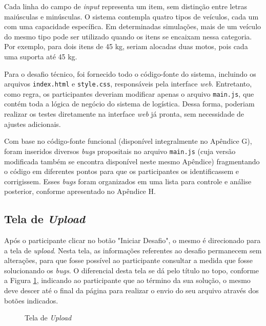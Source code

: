 \documentclass[english,brazilian]{UNISINOSartigo} %
\begin{document}
Cada linha do campo de \textit{input} representa um item, sem distinção entre letras maiúsculas e minúsculas. O sistema contempla quatro tipos de veículos, cada um com uma capacidade específica. Em determinadas simulações, mais de um veículo do mesmo tipo pode ser utilizado quando os itens se encaixam nessa categoria. Por exemplo, para dois itens de 45 kg, seriam alocadas duas motos, pois cada uma suporta até 45 kg.

Para o desafio técnico, foi fornecido todo o código-fonte do sistema, incluindo os arquivos \texttt{index.html} e \texttt{style.css}, responsáveis pela interface \textit{web}. Entretanto, como regra, os participantes deveriam modificar apenas o arquivo \texttt{main.js}, que contém toda a lógica de negócio do sistema de logística. Dessa forma, poderiam realizar os testes diretamente na interface \textit{web} já pronta, sem necessidade de ajustes adicionais.

Com base no código-fonte funcional (disponível integralmente no Apêndice G), foram inseridos diversos \textit{bugs} propositais no arquivo \texttt{main.js} (cuja versão modificada também se encontra disponível neste mesmo Apêndice) fragmentando o código em diferentes pontos para que os participantes os identificassem e corrigissem. Esses \textit{bugs} foram organizados em uma lista para controle e análise posterior, conforme apresentado no Apêndice H.

\subsection{Tela de \textit{Upload}}

Após o participante clicar no botão "Iniciar Desafio", o mesmo é direcionado para a tela de \textit{upload}. Nesta tela, as informações referentes ao desafio permanecem sem alterações, para que fosse possível ao participante consultar a medida que fosse solucionando os \textit{bugs}. O diferencial desta tela se dá pelo título no topo, conforme a Figura \ref{fig:tela_upload}, indicando ao participante que ao término da sua solução, o mesmo deve descer até o final da página para realizar o envio do seu arquivo através dos botões indicados. 

\begin{figure}[ht]
    \caption{Tela de \textit{Upload}}
    \label{fig:tela_upload}
    \centering
    \footnotesize
    \begin{minipage}{.9\textwidth}
        \centering
    \end{minipage}
\end{figure}
\FloatBarrier
\end{document}
